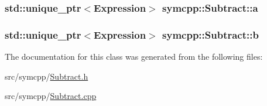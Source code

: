 \subsubsection[{\texorpdfstring{a}{a}}]{\setlength{\rightskip}{0pt plus 5cm}std\+::unique\+\_\+ptr$<${\bf Expression}$>$ symcpp\+::\+Subtract\+::a\hspace{0.3cm}{\ttfamily [private]}}\hypertarget{classsymcpp_1_1Subtract_a3ef44b38ab098faab493079d994d35ba}{}\label{classsymcpp_1_1Subtract_a3ef44b38ab098faab493079d994d35ba}
\subsubsection[{\texorpdfstring{b}{b}}]{\setlength{\rightskip}{0pt plus 5cm}std\+::unique\+\_\+ptr$<${\bf Expression}$>$ symcpp\+::\+Subtract\+::b\hspace{0.3cm}{\ttfamily [private]}}\hypertarget{classsymcpp_1_1Subtract_ac5c9bd87c3554a20d9bf12f5a53a9613}{}\label{classsymcpp_1_1Subtract_ac5c9bd87c3554a20d9bf12f5a53a9613}


The documentation for this class was generated from the following files\+:\begin{DoxyCompactItemize}
\item 
src/symcpp/\hyperlink{Subtract_8h}{Subtract.\+h}\item 
src/symcpp/\hyperlink{Subtract_8cpp}{Subtract.\+cpp}\end{DoxyCompactItemize}
